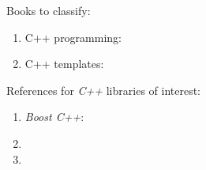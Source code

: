Books to classify: \vspace{-0.3cm}
\begin{enumerate} \itemsep -4pt
\item C++ programming: \cite{Savitch2009,Prata2005,Romanik2003,Schildt2003a,Schildt1998a}
\item C++ templates: \cite[]{Horstmann2012}
\end{enumerate}



References for {\it C++} libraries of interest: \vspace{-0.3cm}
\begin{enumerate} \itemsep -4pt
\item {\it Boost C++}: \cite{Mukherjee2015,Polukhin2013,Schaling2012,Karlsson2006a}
\item 
\item 
\end{enumerate}



